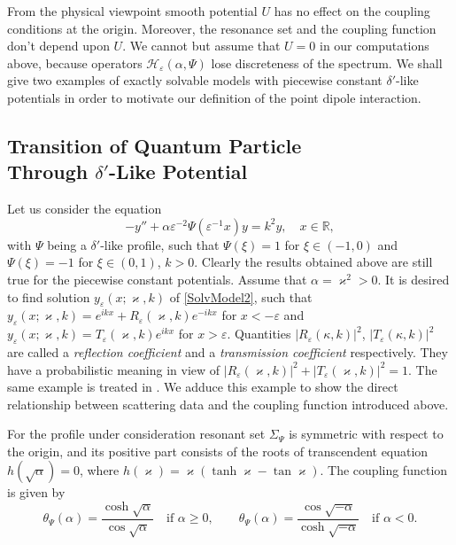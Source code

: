 \documentclass[11pt,english]{amsart}
\begin{document}
From the physical viewpoint  smooth potential $U$ has no effect on the coupling conditions at the origin.
Moreover,  the resonance set and the coupling function don't depend upon $U$.
We cannot but assume that $U=0$ in our computations above, because operators $\mathcal{H}_{\varepsilon}(\alpha,\Psi)$
lose discreteness of  the spectrum.  We shall give two examples of exactly solvable models with  piecewise constant $\delta'$-like potentials in order to motivate our definition of the point dipole interaction.

\subsection{Transition of Quantum Particle\\ Through $\delta'$-Like Potential}\label{subsecScattering}
Let us consider the equation
\begin{equation}\label{SolvModel2}
    -y''+\alpha\varepsilon^{-2}\Psi(\varepsilon^{-1}x)y=k^2 y,\quad x\in\mathbb{R},
\end{equation}
with $\Psi$ being a $\delta'$-like profile, such that  $\Psi(\xi)=1$ for $\xi\in(-1,0)$ and
$\Psi(\xi)=-1$ for $\xi\in(0,1)$, $k>0$. Clearly the results obtained above are still true for the piecewise constant potentials. Assume that $\alpha=\varkappa^2>0$. It is desired to find solution $y_\varepsilon(x;\varkappa,k)$ of \eqref{SolvModel2}, such that $y_\varepsilon(x;\varkappa,k)=e^{ikx}+R_\varepsilon(\varkappa,k)e^{-ikx}$ for
$x<-\varepsilon$ and $y_\varepsilon(x;\varkappa,k)=T_\varepsilon(\varkappa,k)e^{ikx}$ for
$x>\varepsilon$.
Quantities $|R_\varepsilon(\kappa,k)|^2$, $|T_\varepsilon(\kappa,k)|^2$ are called a \emph{reflection coefficient} and  a \emph{transmission coefficient} respectively. They have a probabilistic meaning in view of
$|R_\varepsilon(\varkappa,k)|^2+|T_\varepsilon(\varkappa,k)|^2=1$. The same example is treated in   \cite{ChristianZolotarIermak03}. We adduce this example to show the direct relationship between  scattering data and the coupling function introduced above.

For the profile  under consideration  resonant set  $\Sigma_\Psi$ is symmetric with respect to the origin, and
its positive part consists of the  roots of transcendent equation
$h(\sqrt{\alpha})=0$, where $h(\varkappa)=\varkappa(\operatorname*{tanh}\varkappa-\operatorname*{tan}\varkappa)$. The coupling function is given by
\begin{equation}\label{ThetaForSolvModel}
    \theta_\Psi (\alpha)=\frac{\operatorname*{cosh}\sqrt{\alpha}}{\cos\sqrt{\alpha}}\quad\text{if }\alpha\geq 0,\qquad
    \theta_\Psi (\alpha)=\frac{\cos\sqrt{-\alpha}}{\operatorname*{cosh}\sqrt{-\alpha}}\quad\text{if }\alpha<0.
\end{equation}
\end{document}
